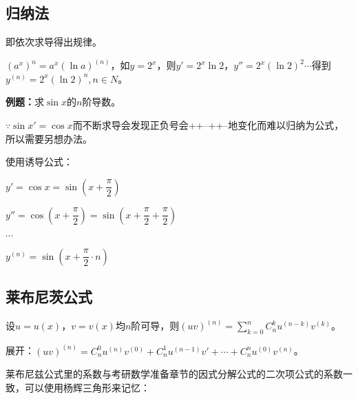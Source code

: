 \documentclass[UTF8, 12pt]{ctexart}
\begin{document}
\subsection{归纳法}

即依次求导得出规律。

$(a^x)^n=a^x(\ln a)^{(n)}$，如$y=2^x$，则$y'=2^x\ln 2$，$y''=2^x(\ln 2)^2\cdots$得到$y^{(n)}=2^x(\ln 2)^n,n\in N$。

\textbf{例题：}求$\sin x$的$n$阶导数。

$\because \sin x'=\cos x$而不断求导会发现正负号会++--++--地变化而难以归纳为公式，所以需要另想办法。

使用诱导公式：

$y'=\cos x=\sin(x+\dfrac{\pi}{2})$

$y''=\cos(x+\dfrac{\pi}{2})=\sin(x+\dfrac{\pi}{2}+\dfrac{\pi}{2})$

$\cdots$

$y^{(n)}=\sin(x+\dfrac{\pi}{2}\cdot n)$

\subsection{莱布尼茨公式}

设$u=u(x)$，$v=v(x)$均$n$阶可导，则$(uv)^{(n)}=\sum_{k=0}^nC_n^ku^{(n-k)}v^{(k)}$。

展开：$(uv)^{(n)}=C_n^0u^{(n)}v^{(0)}+C_n^1u^{(n-1)}v'+\cdots+C_n^nu^{(0)}v^{(n)}$。

莱布尼兹公式里的系数与考研数学准备章节的因式分解公式的二次项公式的系数一致，可以使用杨辉三角形来记忆：
\end{document}
